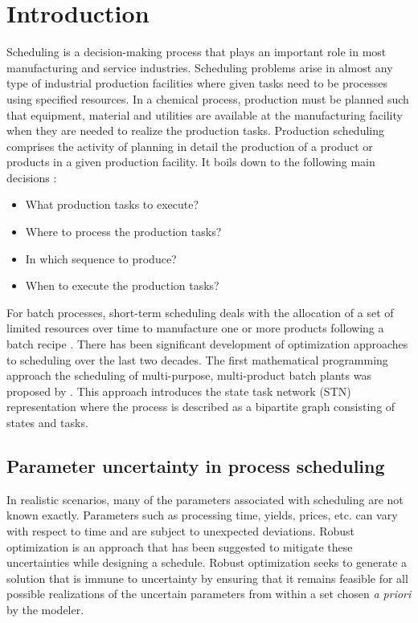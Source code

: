 \chapter{Introduction}
\thispagestyle{plain}

Scheduling is a decision-making process that plays an important role in most manufacturing and service industries. %
Scheduling problems arise in almost any type of industrial production facilities where given tasks need to be processes using specified resources. In a chemical process, production must be planned such that equipment, material and utilities are available at the manufacturing facility when they are needed to realize the production tasks. Production scheduling comprises the activity of planning in detail the production of a product or products in a given production facility. It boils down to the following main decisions \citep{HARJUNKOSKI2014161}:
\begin{itemize}
\item What production tasks to execute?
\item Where to process the production tasks?
\item In which sequence to produce?
\item When to execute the production tasks?
\end{itemize}

For batch processes, short-term scheduling deals with the allocation of a set of limited resources over time to manufacture one or more products following a batch recipe \citep{MENDEZ}. There has been significant development of optimization approaches to scheduling over the last two decades. The first mathematical programming approach the scheduling of multi-purpose, multi-product batch plants was proposed by \cite{KONDILI1993211}. This approach introduces the state task network (STN) representation where the process is described as a bipartite graph consisting of states and tasks.

\section{Parameter uncertainty in process scheduling}
\label{uncertaintysection}
In realistic scenarios, many of the parameters associated with scheduling are not known exactly. Parameters such as processing time, yields, prices, etc. can vary with respect to time and are subject to unexpected deviations. Robust optimization is an approach that has been suggested to mitigate these uncertainties while designing a schedule. Robust optimization seeks to generate a solution that is immune to uncertainty by ensuring that it remains feasible for all possible realizations of the uncertain parameters from within a set chosen \emph{a priori} by the modeler.

